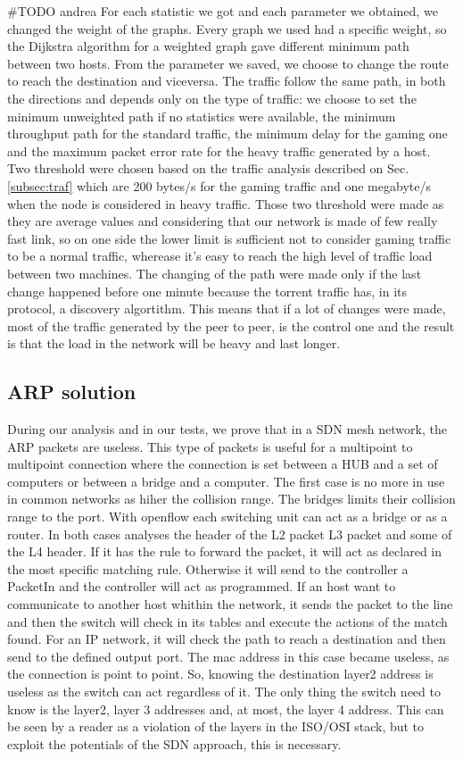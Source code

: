 \documentclass[conference,10pt]{IEEEtran}
\begin{document}
  \#TODO andrea
	For each statistic we got and each parameter we obtained, we changed the weight of the graphs. Every graph we used had a specific weight, so the
	Dijkstra algorithm for a weighted graph gave different minimum path between two hosts. From the parameter we saved, we choose to change the
	route to reach the destination and viceversa. The traffic follow the same path, in both the directions and depends only on the type of traffic:
	we choose to set the minimum unweighted path if no statistics were available, the minimum throughput path for the standard traffic, the minimum
	delay for the gaming one and the maximum packet error rate for the heavy traffic generated by a host.
	Two threshold were chosen based on the traffic analysis described on Sec. \ref{subsec:traf} which are 200 bytes/s for the gaming traffic and one megabyte/s
	when the node is considered in heavy traffic. Those two threshold were made as they are average values and considering that our network is made of few really fast link,
	so on one side the lower limit is sufficient not to consider gaming traffic to be a normal traffic, wherease it's easy to reach the high level of traffic load between two machines.
	The changing of the path were made only if the last change happened before one minute because the torrent traffic has, in its protocol, a discovery
	algortithm. This means that if a lot of changes were made, most of the traffic generated by the peer to peer, is the control one and the result is that the
	load in the network will be heavy and last longer.

  \subsection{ARP solution} 

  During our analysis and in our tests, we prove that in a SDN mesh network, the ARP packets are useless.
  This type of packets is useful for a multipoint to multipoint connection where the connection is set between a
  HUB and a set of computers or between a bridge and a computer. The first case is no more in use in common networks as
  hiher the collision range. The bridges limits their collision range to the port. With openflow each switching unit can
  act as a bridge or as a router. In both cases analyses the header of the L2 packet L3 packet and some of the L4 header.
  If it has the rule to forward the packet, it will act as declared in the most specific matching rule. Otherwise it will
  send to the controller a PacketIn and the controller will act as programmed. If an host want to communicate to another host whithin
  the network, it sends the packet to the line and then the switch will check in its tables and execute the actions of the match found.
  For an IP network, it will check the path to reach a destination and then send to the defined output port. The mac address in this case
  became useless, as the connection is point to point. So, knowing the destination layer2 address is useless as the switch can act
  regardless of it. The only thing the switch need to know is the layer2, layer 3 addresses and, at most, the layer 4 address.
  This can be seen by a reader as a violation of the layers in the ISO/OSI stack, but to exploit the potentials of the SDN approach,
  this is necessary. 
\end{document}
